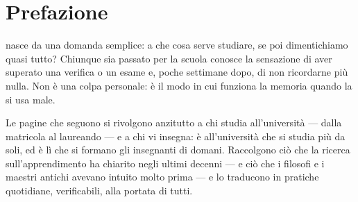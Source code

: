 \chapter{Prefazione}

 nasce da una domanda semplice: a che cosa
serve studiare, se poi dimentichiamo quasi tutto? Chiunque sia passato
per la scuola conosce la sensazione di aver superato una verifica o un
esame e, poche settimane dopo, di non ricordarne più nulla. Non è una
colpa personale: è il modo in cui funziona la memoria quando la si usa
male.

Le pagine che seguono si rivolgono anzitutto a chi studia
all'università --- dalla matricola al laureando --- e a chi vi insegna:
è all'università che si studia più da soli, ed è lì che si formano gli
insegnanti di domani.
Raccolgono ciò che la ricerca sull'apprendimento ha chiarito negli
ultimi decenni --- e ciò che i filosofi e i maestri antichi avevano
intuito molto prima --- e lo traducono in pratiche quotidiane,
verificabili, alla portata di tutti.


\finecapitolo
